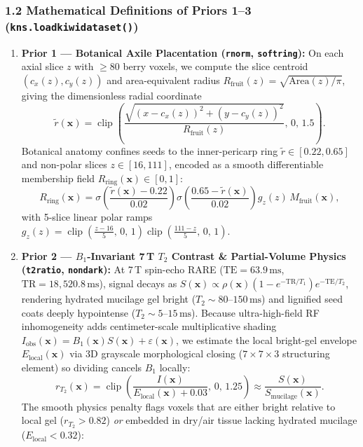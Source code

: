 \documentclass[10pt,a4paper]{article}
\renewcommand{\_}{\origunderscore\allowbreak}
\begin{document}
\subsubsection*{1.2 Mathematical Definitions of Priors 1--3 (\texttt{kns.load\_kiwi\_dataset()})}
\begin{enumerate}
\item \textbf{Prior 1 --- Botanical Axile Placentation (\texttt{r\_norm}, \texttt{soft\_ring}):} On each axial slice $z$ with $\ge 80$ berry voxels, we compute the slice centroid $(c_x(z), c_y(z))$ and area-equivalent radius $R_{\text{fruit}}(z) = \sqrt{\text{Area}(z) / \pi}$, giving the dimensionless radial coordinate
\[
\tilde{r}(\mathbf{x}) = \operatorname{clip}\!\left(\frac{\sqrt{(x - c_x(z))^2 + (y - c_y(z))^2}}{R_{\text{fruit}}(z)},\, 0,\, 1.5\right).
\]
Botanical anatomy confines seeds to the inner-pericarp ring $\tilde{r} \in [0.22, 0.65]$ and non-polar slices $z \in [16, 111]$, encoded as a smooth differentiable membership field $R_{\text{ring}}(\mathbf{x}) \in [0, 1]$:
\[
R_{\text{ring}}(\mathbf{x}) = \sigma\!\left(\frac{\tilde{r}(\mathbf{x}) - 0.22}{0.02}\right)\sigma\!\left(\frac{0.65 - \tilde{r}(\mathbf{x})}{0.02}\right) g_z(z)\, M_{\text{fruit}}(\mathbf{x}),
\]
with 5-slice linear polar ramps $g_z(z) = \operatorname{clip}\!\left(\frac{z - 16}{5},\, 0,\, 1\right)\operatorname{clip}\!\left(\frac{111 - z}{5},\, 0,\, 1\right)$.
\item \textbf{Prior 2 --- $B_1$-Invariant 7\,T $T_2$ Contrast \& Partial-Volume Physics (\texttt{t2\_ratio}, \texttt{non\_dark}):} At 7\,T spin-echo RARE ($\text{TE} = 63.9\,\text{ms}$, $\text{TR} = 18{,}520.8\,\text{ms}$), signal decays as $S(\mathbf{x}) \propto \rho(\mathbf{x})(1 - e^{-\text{TR}/T_1})e^{-\text{TE}/T_2}$, rendering hydrated mucilage gel bright ($T_2 \sim 80$--$150\,\text{ms}$) and lignified seed coats deeply hypointense ($T_2 \sim 5$--$15\,\text{ms}$). Because ultra-high-field RF inhomogeneity adds centimeter-scale multiplicative shading $I_{\text{obs}}(\mathbf{x}) = B_1(\mathbf{x})S(\mathbf{x}) + \varepsilon(\mathbf{x})$, we estimate the local bright-gel envelope $E_{\text{local}}(\mathbf{x})$ via 3D grayscale morphological closing ($7 \times 7 \times 3$ structuring element) so dividing cancels $B_1$ locally:
\[
r_{T_2}(\mathbf{x}) = \operatorname{clip}\!\left(\frac{I(\mathbf{x})}{E_{\text{local}}(\mathbf{x}) + 0.03},\, 0,\, 1.25\right) \approx \frac{S(\mathbf{x})}{S_{\text{mucilage}}(\mathbf{x})}.
\]
The smooth physics penalty flags voxels that are either bright relative to local gel ($r_{T_2} > 0.82$) \textit{or} embedded in dry/\allowbreak{}air tissue lacking hydrated mucilage ($E_{\text{local}} < 0.32$):

\end{enumerate}
\end{document}
